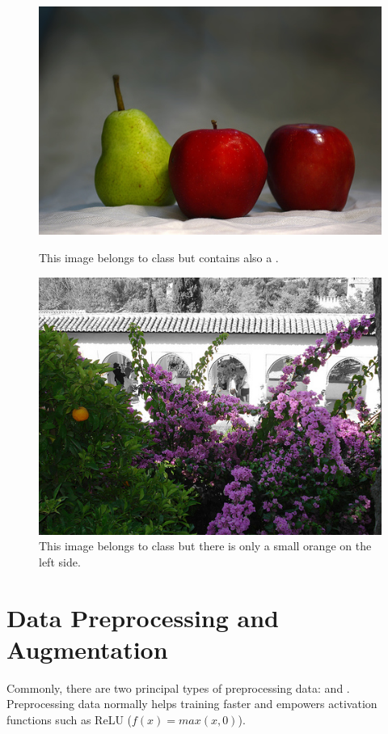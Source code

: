 \begin{figure}[!ht]
	\centering
	\begin{minipage}[t]{0.45\linewidth}
		\includegraphics[scale=0.37]{./figures/imhard1}
		\caption{This image belongs to class  but contains also a .}
		\label{fig:imhard1}
	\end{minipage}
	\quad
	\begin{minipage}[t]{0.45\linewidth}
		\includegraphics[scale=0.35]{./figures/imhard2}
		\caption{This image belongs to class  but there is only a small orange on the left side.}
		\label{fig:imhard2}
	\end{minipage}
\end{figure}

\section{Data Preprocessing and Augmentation}
\label{sec:dataPrepAug}
Commonly, there are two principal types of preprocessing data:  and . Preprocessing data normally helps training faster and empowers activation functions such as ReLU ($f(x) = max(x, 0)$).

